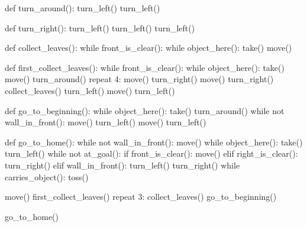\documentclass[
  b5paperpaper,
  DIV=11,
  numbers=noendperiod]{scrreprt}
\newenvironment{Shaded}{\begin{snugshade}}{\end{snugshade}}
\newcommand{\ControlFlowTok}[1]{\textcolor[rgb]{0.00,0.23,0.31}{#1}}
\newcommand{\DecValTok}[1]{\textcolor[rgb]{0.68,0.00,0.00}{#1}}
\newcommand{\KeywordTok}[1]{\textcolor[rgb]{0.00,0.23,0.31}{#1}}
\newcommand{\NormalTok}[1]{\textcolor[rgb]{0.00,0.23,0.31}{#1}}
\begin{document}
\begin{Shaded}
\begin{Highlighting}[]
\KeywordTok{def}\NormalTok{ turn\_around():}
\NormalTok{    turn\_left()}
\NormalTok{    turn\_left()}

\KeywordTok{def}\NormalTok{ turn\_right():}
\NormalTok{    turn\_left()}
\NormalTok{    turn\_left()}
\NormalTok{    turn\_left()}

\KeywordTok{def}\NormalTok{ collect\_leaves():}
    \ControlFlowTok{while}\NormalTok{ front\_is\_clear():}
        \ControlFlowTok{while}\NormalTok{ object\_here():}
\NormalTok{            take()}
\NormalTok{        move()}
        
\KeywordTok{def}\NormalTok{ first\_collect\_leaves():}
    \ControlFlowTok{while}\NormalTok{ front\_is\_clear():}
        \ControlFlowTok{while}\NormalTok{ object\_here():}
\NormalTok{            take()}
\NormalTok{        move()            }
\NormalTok{    turn\_around()}
\NormalTok{    repeat }\DecValTok{4}\NormalTok{:}
\NormalTok{        move()}
\NormalTok{    turn\_right()}
\NormalTok{    move()}
\NormalTok{    turn\_right()}
\NormalTok{    collect\_leaves()}
\NormalTok{    turn\_left()}
\NormalTok{    move()}
\NormalTok{    turn\_left()}
            
\KeywordTok{def}\NormalTok{ go\_to\_beginning():}
    \ControlFlowTok{while}\NormalTok{ object\_here():}
\NormalTok{        take()    }
\NormalTok{    turn\_around()}
    \ControlFlowTok{while} \KeywordTok{not}\NormalTok{ wall\_in\_front():}
\NormalTok{        move()}
\NormalTok{    turn\_left()}
\NormalTok{    move()}
\NormalTok{    turn\_left()    }

\KeywordTok{def}\NormalTok{ go\_to\_home():}
    \ControlFlowTok{while} \KeywordTok{not}\NormalTok{ wall\_in\_front():}
\NormalTok{        move()}
        \ControlFlowTok{while}\NormalTok{ object\_here():}
\NormalTok{            take()}
\NormalTok{    turn\_left()}
    \ControlFlowTok{while} \KeywordTok{not}\NormalTok{ at\_goal():}
        \ControlFlowTok{if}\NormalTok{ front\_is\_clear():}
\NormalTok{            move()}
        \ControlFlowTok{elif}\NormalTok{ right\_is\_clear():}
\NormalTok{            turn\_right()}
        \ControlFlowTok{elif}\NormalTok{ wall\_in\_front():}
\NormalTok{           turn\_left()}
\NormalTok{    turn\_right()}
    \ControlFlowTok{while}\NormalTok{ carries\_object():}
\NormalTok{        toss()}
        
\NormalTok{move()    }
\NormalTok{first\_collect\_leaves()}
\NormalTok{repeat }\DecValTok{3}\NormalTok{:}
\NormalTok{    collect\_leaves()}
\NormalTok{    go\_to\_beginning()}


\NormalTok{go\_to\_home()}
\end{Highlighting}
\end{Shaded}
\end{document}
